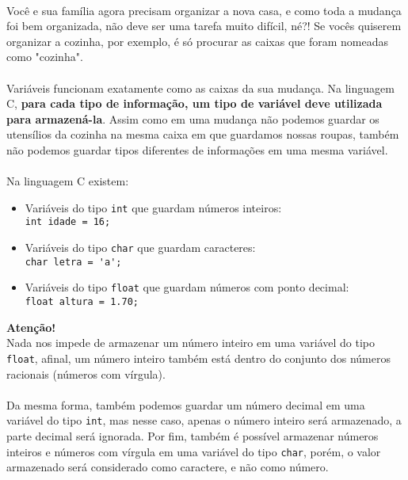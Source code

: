     \paragraph{}
    Você e sua família agora precisam organizar a nova casa, e como toda a mudança foi bem organizada, não deve ser uma tarefa muito difícil, né?! Se vocês quiserem organizar a cozinha, por exemplo, é só procurar as caixas que foram nomeadas como "cozinha". 
    
    \paragraph{}
    Variáveis funcionam exatamente como as caixas da sua mudança. Na linguagem C, \textbf{para cada tipo de informação, um tipo de variável deve utilizada para armazená-la}. Assim como em uma mudança não podemos guardar os utensílios da cozinha na mesma caixa em que guardamos nossas roupas, também não podemos guardar tipos diferentes de informações em uma mesma variável.
    \\~\\
    Na linguagem C existem: 
    
\begin{itemize}
\item Variáveis do tipo \lstinline[columns=fixed]{int} que guardam números inteiros: \\
  \lstinline[columns=fixed]{int idade = 16;}
\item Variáveis do tipo \lstinline[columns=fixed]{char} que guardam caracteres: \\
  \lstinline[columns=fixed]{char letra = 'a';}
\item Variáveis do tipo \lstinline[columns=fixed]{float} que  guardam números com ponto decimal: \\
  \lstinline[columns=fixed]{float altura = 1.70;}
\end{itemize}

\begin{center}
    \textcolor{mydarkblue}{\textbf{Atenção!}}
    \\ Nada nos impede de armazenar um número inteiro em uma variável do tipo \lstinline[columns=fixed]{float}, afinal, um número inteiro também está dentro do conjunto dos números racionais (números com vírgula).
\end{center}

\paragraph{}
Da mesma forma, também podemos guardar um número decimal em uma variável do tipo \lstinline[columns=fixed]{int}, mas nesse caso, apenas o número inteiro será armazenado, a parte decimal será ignorada.
Por fim, também é possível armazenar números inteiros e números com vírgula em uma variável do tipo \lstinline[columns=fixed]{char}, porém, o valor armazenado será considerado como caractere, e não como número.\\

